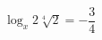 \begin{ex}[type=equation]
	\begin{condition}
		$\log_x 2\sqrt[4]{2} = -\dfrac{3}{4}$
	\end{condition}
\end{ex}